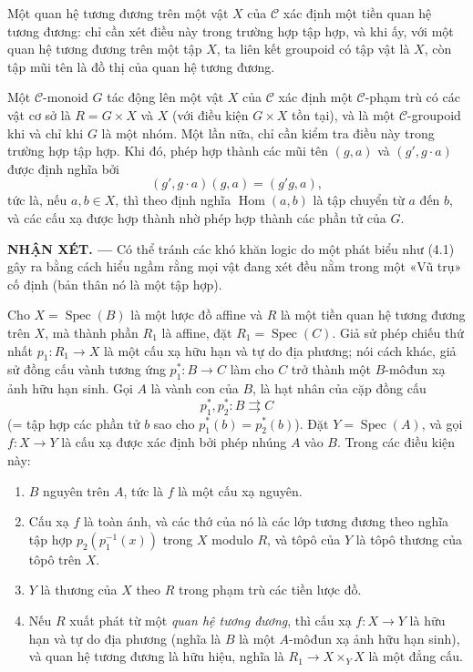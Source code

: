 Một quan hệ tương đương trên một vật $X$ của $\mathcal C$ xác định một tiền
quan hệ tương đương: chỉ cần xét điều này trong trường hợp tập hợp, và khi ấy,
với một quan hệ tương đương trên một tập $X$, ta liên kết groupoid có tập vật
là $X$, còn tập mũi tên là đồ thị của quan hệ tương đương.

Một $\mathcal C$-monoid $G$ tác động lên một vật $X$ của $\mathcal C$ xác định
một $\mathcal C$-phạm trù có các vật cơ sở là $R=G\times X$ và $X$ (với điều
kiện $G\times X$ tồn tại), và là một $\mathcal C$-groupoid khi và chỉ khi $G$
là một nhóm. Một lần nữa, chỉ cần kiểm tra điều này trong trường hợp tập hợp.
Khi đó, phép hợp thành các mũi tên $(g,a)$ và $(g',g\cdot a)$ được định nghĩa
bởi
\[
  (g',g\cdot a)(g,a)=(g'g,a),
\]
tức là, nếu $a,b\in X$, thì theo định nghĩa $\operatorname{Hom}(a,b)$ là tập
chuyển từ $a$ đến $b$, và các cấu xạ được hợp thành nhờ phép hợp thành các phần
tử của $G$.

\medskip
\noindent\textbf{NHẬN XÉT. ---} Có thể tránh các khó khăn logic do một phát
biểu như (4.1) gây ra bằng cách hiểu ngầm rằng mọi vật đang xét đều nằm trong
một «Vũ trụ» cố định (bản thân nó là một tập hợp).


 Cho $X=\operatorname{Spec}(B)$ là một lược đồ affine và
$R$ là một tiền quan hệ tương đương trên $X$, mà thành phần $R_1$ là affine,
đặt $R_1=\operatorname{Spec}(C)$. Giả sử phép chiếu thứ nhất
$p_1:R_1\to X$ là một cấu xạ hữu hạn và tự do địa phương; nói cách khác, giả
sử đồng cấu vành tương ứng $p_1^*:B\to C$ làm cho $C$ trở thành một
$B$-môđun xạ ảnh hữu hạn sinh. Gọi $A$ là vành con của $B$, là hạt nhân của
cặp đồng cấu
\[
  p_1^*,p_2^*:B\rightrightarrows C
\]
(= tập hợp các phần tử $b$ sao cho $p_1^*(b)=p_2^*(b)$). Đặt
$Y=\operatorname{Spec}(A)$, và gọi $f:X\to Y$ là cấu xạ được xác định bởi phép
nhúng $A$ vào $B$. Trong các điều kiện này:
\begin{enumerate}
\item[(i)] $B$ nguyên trên $A$, tức là $f$ là một cấu xạ nguyên.

\item[(ii)] Cấu xạ $f$ là toàn ánh, và các thớ của nó là các lớp tương đương
theo nghĩa tập hợp $p_2\allowbreak(p_1^{-1}(x))$ trong $X$ modulo $R$, và
tôpô của $Y$ là tôpô thương của tôpô trên $X$.

\item[(iii)] $Y$ là thương của $X$ theo $R$ trong phạm trù các tiền lược đồ.

\item[(iv)] Nếu $R$ xuất phát từ một \emph{quan hệ tương đương}, thì cấu xạ
$f:X\to Y$ là hữu hạn và tự do địa phương (nghĩa là $B$ là một $A$-môđun xạ
ảnh hữu hạn sinh), và quan hệ tương đương là hữu hiệu, nghĩa là
$R_1\to X\times_Y X$ là một đẳng cấu.
\end{enumerate}

